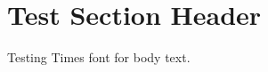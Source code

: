 \documentclass[times]{ui1activity}
\begin{document}
\section{Test Section Header}
Testing Times font for body text.
\end{document}

